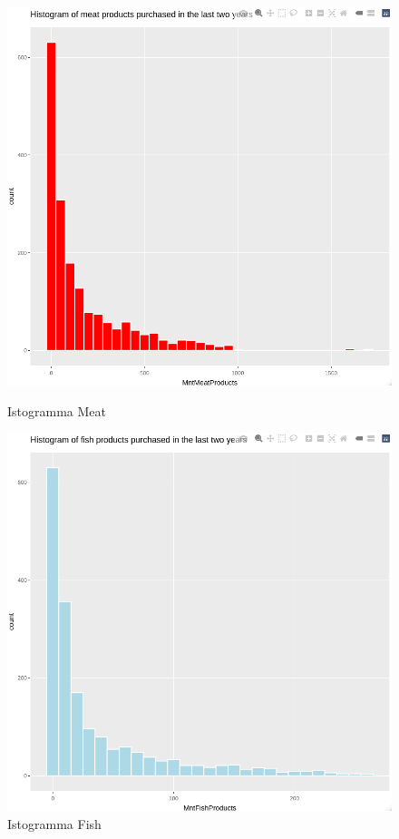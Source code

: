 \documentclass[letterpaper,11pt]{article}
\begin{document}
\begin{figure}[H]
  \centering
  \begin{minipage}[b]{0.4\textwidth}
    \includegraphics[width=\textwidth]{Img/EDA/EDA020.png}
    \caption{Istogramma Meat}
     \label{fig:IstogrammaMeat}
  \end{minipage}
  \hfill
  \begin{minipage}[b]{0.4\textwidth}
    \includegraphics[width=\textwidth]{Img/EDA/EDA021.png}
    \caption{Istogramma Fish}
     \label{fig:IstogrammaFish}
  \end{minipage}
\end{figure}
\end{document}
